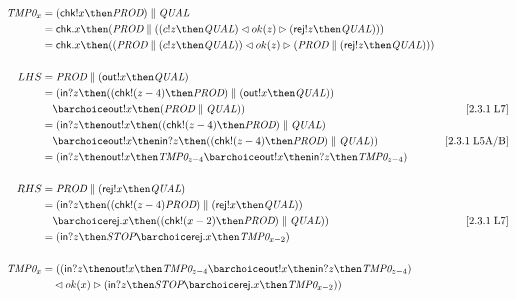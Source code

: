 \documentclass[a4paper, 11pt]{article}
\def\Prod{\textit{PROD}}
\def\Qual{\textit{QUAL}}
\def\Stop{\textit{STOP}}
\def\inc{\textsf{in}}
\def\chk{\textsf{chk}}
\def\rej{\textsf{rej}}
\def\outc{\textsf{out}}
\newcommand{\law}[2]{[#1\;\text{#2}]}
\newcommand{\Tmp}[2]{\textit{TMP#1}_{#2}}
\begin{document}
\begin{align*}
    \Tmp{0}{x}
    &= (\chk ! x \then \Prod) \parallel \Qual \\
    &= \chk . x \then (\Prod \parallel ((c ! z \then \Qual) \lhd ok(z) \rhd (\rej ! z \then \Qual))) \\
    &= \chk . x \then ((\Prod \parallel (c ! z \then \Qual)) \lhd ok(z) \rhd (\Prod \parallel (\rej ! z \then \Qual))) \\ \\
    LHS
    &= \Prod \parallel (\outc ! x \then \Qual) \\
    &= (\inc ? z \then ((\chk ! (z-4) \then \Prod) \parallel (\outc ! x \then \Qual)) \\
    &\quad \barchoice \outc ! x \then (\Prod \parallel \Qual)) & \law{2.3.1}{L7} \\
    &= (\inc ? z \then \outc ! x \then ((\chk ! (z-4) \then \Prod) \parallel \Qual) \\
    &\quad \barchoice \outc ! x \then \inc ? z \then ((\chk ! (z-4) \then \Prod) \parallel \Qual)) & \law{2.3.1}{L5A/B} \\
    &= (\inc ? z \then \outc ! x \then \Tmp{0}{z-4} \barchoice \outc ! x \then \inc ? z \then \Tmp{0}{z-4}) \\ \\
    RHS
    &= \Prod \parallel (\rej ! x \then \Qual) \\
    &= (\inc ? z \then ((\chk ! (z-4) \Prod) \parallel (\rej ! x \then \Qual)) \\
    &\quad \barchoice \rej . x \then ((\chk ! (x-2) \then \Prod) \parallel \Qual)) & \law{2.3.1}{L7} \\
    &= (\inc ? z \then \Stop \barchoice \rej . x \then \Tmp{0}{x-2}) \\ \\
    \Tmp{0}{x}
    &= ((\inc ? z \then \outc ! x \then \Tmp{0}{z-4} \barchoice \outc ! x \then \inc ? z \then \Tmp{0}{z-4}) \\
    &\quad \lhd ok(x) \rhd (\inc ? z \then \Stop \barchoice \rej . x \then \Tmp{0}{x-2}))
\end{align*}
\end{document}
